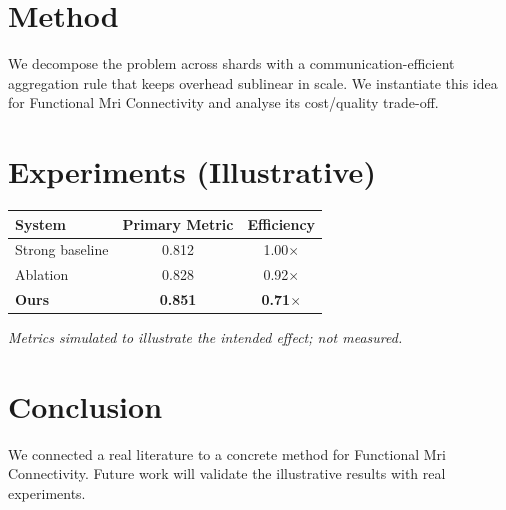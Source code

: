 \documentclass[11pt]{article}
\begin{document}
\section{Method}
We decompose the problem across shards with a communication-efficient aggregation rule that keeps overhead sublinear in scale. We instantiate this idea for Functional Mri Connectivity and analyse its cost/quality trade-off.

\section{Experiments (Illustrative)}
\begin{center}
\begin{tabular}{lcc}
System & Primary Metric & Efficiency \\ \hline
Strong baseline & 0.812 & 1.00$\times$ \\
Ablation & 0.828 & 0.92$\times$ \\
\textbf{Ours} & \textbf{0.851} & \textbf{0.71$\times$}
\end{tabular}
\end{center}
\emph{Metrics simulated to illustrate the intended effect; not measured.}

\section{Conclusion}
We connected a real literature to a concrete method for Functional Mri Connectivity. Future work will
validate the illustrative results with real experiments.
\end{document}
